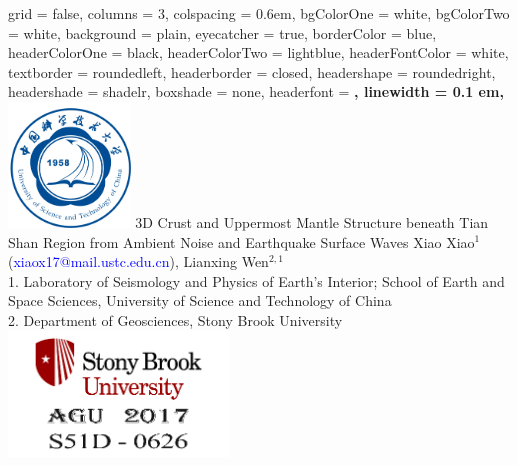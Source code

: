 \documentclass[
    landscape,      %
    paperwidth = 1200mm,
    paperheight = 900mm,
    fontscale = 0.4,
    margin = 1.7cm,
]{baposter}
\begin{document}
\begin{poster}{
    grid = false,            %
    columns = 3,
    colspacing = 0.6em,
    bgColorOne = white,
    bgColorTwo = white,
    background = plain,     %
    eyecatcher = true,      %
    borderColor = blue,
    headerColorOne = black,
    headerColorTwo = lightblue,
    headerFontColor = white,
    textborder = roundedleft,   %
    headerborder = closed,      %
    headershape = roundedright, %
    headershade = shadelr,      %
    boxshade = none,            %
    headerfont = \Large\bf\textsc,
    linewidth = 0.1 em,}
{\includegraphics[height=9em]{./images/USTC_logo_blue.jpg}}
{\Huge{3D Crust and Uppermost Mantle Structure beneath Tian Shan Region from Ambient Noise and Earthquake Surface Waves}}
{
    \vspace{0.3em}
    Xiao Xiao$^1$ (\textcolor{blue}{xiaox17@mail.ustc.edu.cn}),
    Lianxing Wen$^{2,1}$ \\
    \vspace{0.3em}
    1. Laboratory of Seismology and Physics of Earth's Interior; School of Earth and Space Sciences, University of Science and Technology of China  \\
    2. Department of Geosciences, Stony Brook University  \\
}
{\includegraphics[height=9em]{./images/Righthand.png}}
\vspace{0.4cm}


\end{poster}
\end{document}
